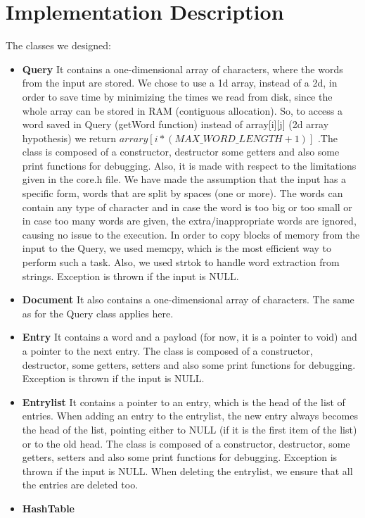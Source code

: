 \documentclass{article}
\begin{document}
\section{Implementation Description}
The classes we designed:
\begin{itemize}
  \item \textbf{Query}
  It contains a one-dimensional array of characters, where the words from the input are stored. We chose to use a 1d array, instead of a 2d, in order to save time by minimizing the times we read from disk, since the whole array can be stored in RAM (contiguous allocation). So, to access a word saved in Query (getWord function) instead of array[i][j] (2d array hypothesis) we return $arrary[i*(MAX\_WORD\_LENGTH + 1)]$ .The class is composed of a constructor, destructor some getters and also some print functions for debugging. Also, it is made with respect to the limitations given in the core.h file. We have made the assumption that the input has a specific form, words that are split by spaces (one or more). The words can contain any type of character and in case the word is too big or too small or in case too many words are given, the extra/inappropriate words are ignored, causing no issue to the execution. In order to copy blocks of memory from the input to the Query, we used memcpy, which is the most efficient way to perform such a task. Also, we used strtok to handle word extraction from strings. Exception is thrown if the input is NULL.
  \item \textbf{Document} 
  It also contains a one-dimensional array of characters. The same as for the Query class applies here.
  \item \textbf{Entry}
  It contains a word and a payload (for now, it is a pointer to void) and a pointer to the next entry. The class is composed of a constructor, destructor, some getters, setters and also some print functions for debugging. Exception is thrown if the input is NULL.
  \item \textbf{Entrylist} 
  It contains a pointer to an entry, which is the head of the list of entries. When adding an entry to the entrylist, the new entry always becomes the head of the list, pointing either to NULL (if it is the first item of the list) or to the old head. The class is composed of a constructor, destructor, some getters, setters and also some print functions for debugging. Exception is thrown if the input is NULL.
  When deleting the entrylist, we ensure that all the entries are deleted too.
  \item \textbf{HashTable}

\end{itemize}
\end{document}
